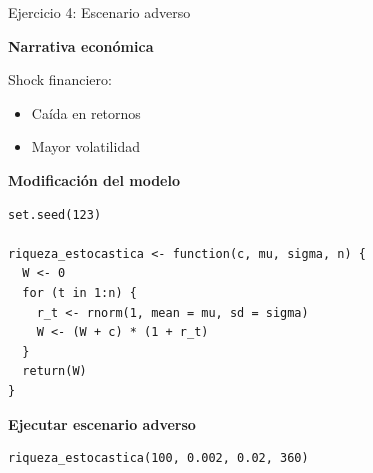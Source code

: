 \documentclass[10pt]{beamer}
\begin{document}
\begin{frame}[fragile]{Ejercicio 4: Escenario adverso}

\textbf{Narrativa económica}

\vspace{0.2cm}
Shock financiero:
\begin{itemize}
\item Caída en retornos
\item Mayor volatilidad
\end{itemize}

\textbf{Modificación del modelo}

\begin{lstlisting}
set.seed(123)

riqueza_estocastica <- function(c, mu, sigma, n) {
  W <- 0
  for (t in 1:n) {
    r_t <- rnorm(1, mean = mu, sd = sigma)
    W <- (W + c) * (1 + r_t)
  }
  return(W)
}
\end{lstlisting}

\vspace{0.3cm}

\textbf{Ejecutar escenario adverso}

\begin{lstlisting}
riqueza_estocastica(100, 0.002, 0.02, 360)
\end{lstlisting}

\end{frame}

\end{document}
